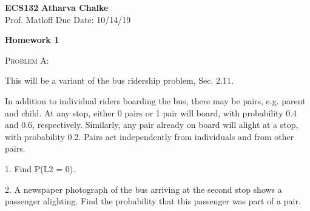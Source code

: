 \documentclass[12pt]{article}
\newenvironment{statement}[1]
{\begin{mdframed}[linewidth=0.6pt]
        \textsc{ #1:}

}
    {\end{mdframed}}
\begin{document}
\noindent
\textbf{ECS132} \hfill \textbf{Atharva Chalke} \\
\normalsize Prof. Matloff \hfill Due Date: 10/14/19 \\


\begin{center}
\textbf{Homework 1}
\end{center}

\begin{statement}{Problem A}
This will be a variant of the bus ridership problem, Sec. 2.11.

In addition to individual riders boarding the bus, there may be pairs, e.g. parent and child. At any stop, either 0 pairs or 1 pair will board, with probability 0.4 and 0.6, respectively. Similarly, any pair already on board will alight at a stop, with probability 0.2. Pairs act independently from individuals and from other pairs.

1. Find P(L2 = 0).

2. A newspaper photograph of the bus arriving at the second stop shows a passenger alighting. Find the probability that this passenger was part of a pair.
\end{statement}

\end{document}

